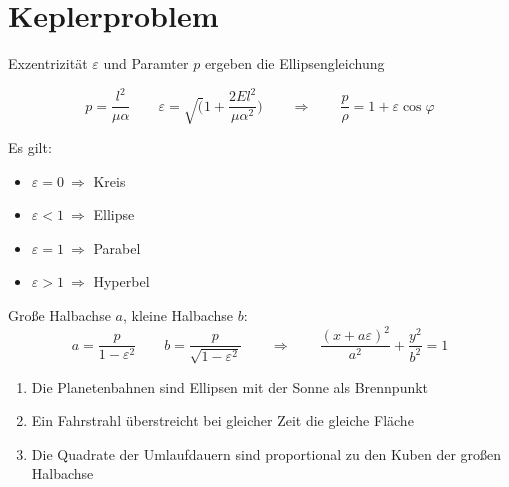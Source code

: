 \section{Keplerproblem}

\begin{frameddefn}
	
	Exzentrizität $\varepsilon$ und Paramter $p$ ergeben die Ellipsengleichung
	
	\[ p = \frac{l^2}{\mu \alpha} \qquad \varepsilon = \sqrt(1 + \frac{2 E l^2}{\mu \alpha^2}) \qquad \Rightarrow \qquad \frac{p}{\rho} = 1 + \varepsilon \cos \varphi \]
	
	Es gilt:
	\begin{itemize}
		\item $\varepsilon = 0 \ \Rightarrow$ Kreis
		\item $\varepsilon < 1 \ \Rightarrow$ Ellipse
		\item $\varepsilon = 1 \ \Rightarrow$ Parabel
		\item $\varepsilon > 1 \ \Rightarrow$ Hyperbel
	\end{itemize}
	
	Große Halbachse $a$, kleine Halbachse $b$:
	\[ a = \frac{p}{1 - \varepsilon^2} \qquad b = \frac{p}{\sqrt{1 - \varepsilon^2}} \qquad \Rightarrow \qquad \frac{(x+a\varepsilon)^2}{a^2} + \frac{y^2}{b^2} = 1\]
	
\end{frameddefn}

\begin{framedthm}
	\begin{enumerate}
		\item Die Planetenbahnen sind Ellipsen mit der Sonne als Brennpunkt
		\item Ein Fahrstrahl überstreicht bei gleicher Zeit die gleiche Fläche
		\item Die Quadrate der Umlaufdauern sind proportional zu den Kuben der großen Halbachse
	\end{enumerate}
\end{framedthm}


